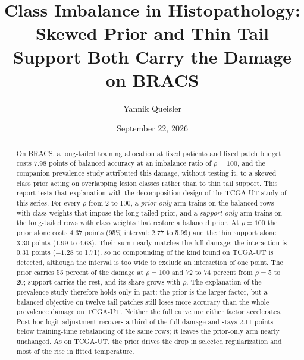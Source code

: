 \documentclass[11pt]{article}
\title{Class Imbalance in Histopathology:\\Skewed Prior and Thin Tail Support Both Carry the Damage on BRACS}
\author{Yannik Queisler}
\date{September 22, 2026}
\begin{document}
\raggedbottom
{}
\setlength{\emergencystretch}{2em}
\maketitle
\begin{abstract}
\noindent On BRACS, a long-tailed training allocation at fixed patients and fixed patch budget costs 7.98 points of balanced accuracy at an imbalance ratio of $\rho=100$, and the companion prevalence study attributed this damage, without testing it, to a skewed class prior acting on overlapping lesion classes rather than to thin tail support. This report tests that explanation with the decomposition design of the TCGA-UT study of this series. For every $\rho$ from 2 to 100, a \emph{prior-only} arm trains on the balanced rows with class weights that impose the long-tailed prior, and a \emph{support-only} arm trains on the long-tailed rows with class weights that restore a balanced prior. At $\rho=100$ the prior alone costs 4.37 points (95\% interval: 2.77 to 5.99) and the thin support alone 3.30 points (1.99 to 4.68). Their sum nearly matches the full damage: the interaction is 0.31 points ($-1.28$ to 1.71), so no compounding of the kind found on TCGA-UT is detected, although the interval is too wide to exclude an interaction of one point. The prior carries 55 percent of the damage at $\rho=100$ and 72 to 74 percent from $\rho=5$ to 20; support carries the rest, and its share grows with $\rho$. The explanation of the prevalence study therefore holds only in part: the prior is the larger factor, but a balanced objective on twelve tail patches still loses more accuracy than the whole prevalence damage on TCGA-UT. Neither the full curve nor either factor accelerates. Post-hoc logit adjustment recovers a third of the full damage and stays 2.11 points below training-time rebalancing of the same rows; it leaves the prior-only arm nearly unchanged. As on TCGA-UT, the prior drives the drop in selected regularization and most of the rise in fitted temperature.
\end{abstract}
\end{document}
